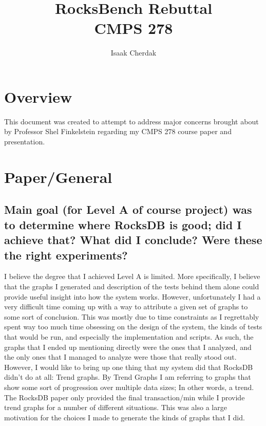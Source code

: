\documentclass[11pt]{article}
\title{RocksBench Rebuttal\\CMPS 278}
\author{Isaak Cherdak}
\begin{document}
\maketitle

\pagebreak

\section{Overview}

This document was created to attempt to address major concerns brought about by
Professor Shel Finkelstein regarding my CMPS 278 course paper and presentation.

\section{Paper/General}

\subsection{Main goal (for Level A of course project) was to determine where
  RocksDB is good; did I achieve that? What did I conclude? Were these the
right experiments?}

I believe the degree that I achieved Level A is limited. More specifically, I
believe that the graphs I generated and description of the tests behind them
alone could provide useful insight into how the system works. However,
unfortunately I had a very difficult time coming up with a way to attribute a
given set of graphs to some sort of conclusion. This was mostly due to time
constraints as I regrettably spent way too much time obsessing on the design of
the system, the kinds of tests that would be run, and especially the
implementation and scripts. As such, the graphs that I ended up mentioning
directly were the ones that I analyzed, and the only ones that I managed to
analyze were those that really stood out. However, I would like to bring up one
thing that my system did that RocksDB didn't do at all: Trend graphs. By Trend
Graphs I am referring to graphs that show some sort of progression over multiple
data sizes; In other words, a trend. The RocksDB paper only provided the final
transaction/min while I provide trend graphs for a number of different
situations. This was also a large motivation for the choices I made to generate
the kinds of graphs that I did.
\end{document}
